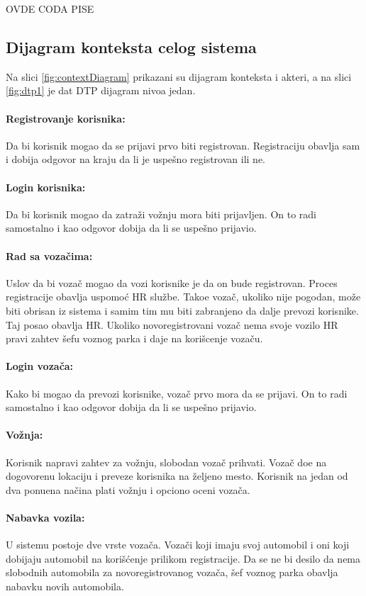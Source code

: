 \documentclass{article}
\begin{document}
OVDE CODA PISE
     
\subsection{\bfseries Dijagram konteksta celog sistema}

\quad Na slici \ref{fig:contextDiagram} prikazani su dijagram konteksta i akteri, a na slici \ref{fig:dtp1} je dat DTP dijagram nivoa jedan.
\paragraph{Registrovanje korisnika:}
    Da bi korisnik mogao da se prijavi prvo biti registrovan. Registraciju obavlja sam i dobija odgovor na kraju da li je uspe\v sno registrovan ili ne.
\paragraph{Login korisnika:}
    Da bi korisnik mogao da zatra\v zi vo\v znju mora biti prijavljen. On to radi samostalno i kao odgovor dobija da li se uspe\v sno prijavio.
\paragraph{Rad sa voza\v cima:}
    Uslov da bi voza\v c mogao da vozi korisnike je da on bude registrovan. Proces registracije obavlja uspomo\' c HR slu\v zbe. Tako\dj e voza\v c, ukoliko nije pogodan, mo\v ze biti obrisan iz sistema i samim tim mu biti zabranjeno da dalje prevozi korisnike. Taj posao obavlja HR. Ukoliko novoregistrovani voza\v c nema svoje vozilo HR pravi zahtev \v sefu voznog parka i daje na kori\v scenje voza\v cu.
\paragraph{Login voza\v ca:}
    Kako bi mogao da prevozi korisnike, voza\v c prvo mora da se prijavi. On to radi samostalno i kao odgovor dobija da li se uspe\v sno prijavio.
\paragraph{Vo\v znja:}
    Korisnik napravi zahtev za vo\v znju, slobodan voza\v c prihvati. Voza\v c do\dj e na dogovorenu lokaciju i preveze korisnika na \v zeljeno mesto. Korisnik na jedan od dva ponu\dj ena na\v cina plati vo\v znju i opciono oceni voza\v ca.
\paragraph{Nabavka vozila:}
    U sistemu postoje dve vrste voza\v ca. Voza\v ci koji imaju svoj automobil i oni koji dobijaju automobil na kori\v s\' cenje prilikom registracije. Da se ne bi desilo da nema slobodnih automobila za novoregistrovanog voza\v ca, \v sef voznog parka obavlja nabavku novih automobila.
\end{document}
